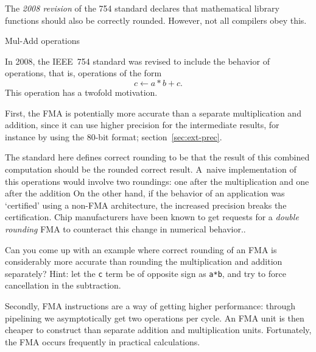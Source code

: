 \begin{remark}
  The \emph{2008 revision} of the 754 standard
  declares that mathematical library functions should also be correctly rounded.
  However, not all compilers obey this.
\end{remark}


 {Mul-Add operations}

In 2008, the IEEE~754 standard was revised to include the behavior
of  operations, that is, operations of the
form \begin{equation}
  c \leftarrow a*b+c.
\end{equation}
This operation has a twofold motivation.

First, the \ac{FMA} is potentially more accurate than a separate
multiplication and addition, since it can use higher precision for the
intermediate results, for instance by using the 80-bit
 format;
section~\ref{sec:ext-prec}.

The standard here defines correct rounding to be that the result of
this combined computation should be the rounded correct
result. A~naive implementation of this operations would involve two
roundings: one after the multiplication and one after the
addition\footnoteenv
{On the other hand, if the behavior of an
  application was `certified' using a non-FMA architecture, the
  increased precision breaks the certification. Chip manufacturers
  have been known to get requests for a
  \emph{double rounding}
  FMA to counteract this change in numerical behavior.}.

\begin{exercise}
  Can you come up with an example where correct rounding of
  an \ac{FMA} is considerably more accurate than rounding the
  multiplication and addition separately? Hint: let the \lstinline{c} term be
  of opposite sign as \lstinline{a*b}, and try to force cancellation in the
  subtraction.
\end{exercise}

Secondly, \ac{FMA} instructions are a way of getting higher
performance: through pipelining we asymptotically get two operations
per cycle. An \ac{FMA} unit is then cheaper to construct than separate
addition and multiplication units. Fortunately, the \ac{FMA} occurs
frequently in practical calculations.

